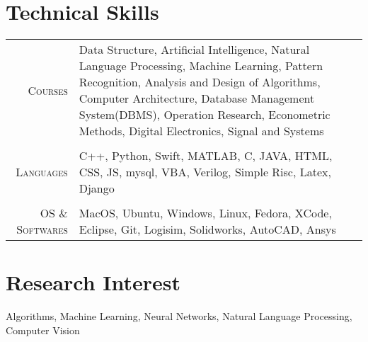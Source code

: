 \documentclass[a4paper,10pt]{article}
\begin{document}
\section{Technical Skills}
\begin{tabular}{r|p{15cm}}
 \textsc{Courses}&Data Structure, Artificial Intelligence, Natural Language Processing, Machine Learning, Pattern Recognition, Analysis and Design of Algorithms, Computer Architecture, Database Management System(DBMS), Operation Research, Econometric Methods, Digital Electronics, Signal and Systems\\\multicolumn{2}{c}{}\\
\textsc{Languages}&C++, Python, Swift, MATLAB, C, JAVA, HTML, CSS, JS, mysql, VBA, Verilog, Simple Risc, Latex, Django\\\multicolumn{2}{c}{}\\
\textsc{OS \& Softwares}&MacOS, Ubuntu, Windows, Linux, Fedora, XCode, Eclipse, Git, Logisim, Solidworks, AutoCAD, Ansys\\
\end{tabular}

\section{Research Interest}
\begin{flushleft}
Algorithms, Machine Learning, Neural Networks, Natural Language Processing, Computer Vision
\end{flushleft}
\end{document}
